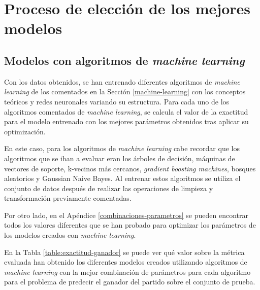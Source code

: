 \section{Proceso de elección de los mejores modelos}
\subsection{Modelos con algoritmos de \textit{machine learning}}
Con los datos obtenidos, se han entrenado diferentes algoritmos de \textit{machine learning} de los comentados en la Sección \ref{machine-learning} con los conceptos teóricos y redes neuronales variando su estructura. Para cada uno de los algoritmos comentados de \textit{machine learning}, se calcula el valor de la exactitud para el modelo entrenado con los mejores parámetros obtenidos tras aplicar su optimización.

En este caso, para los algoritmos de \textit{machine learning} cabe recordar que los algoritmos que se iban a evaluar eran los árboles de decisión, máquinas de vectores de soporte, k-vecinos más cercanos, \textit{gradient boosting machines}, bosques aleatorios y Gaussian Naive Bayes. Al entrenar estos algoritmos se utiliza el conjunto de datos después de realizar las operaciones de limpieza y transformación previamente comentadas.

Por otro lado, en el Apéndice \ref{combinaciones-parametros} se pueden encontrar todos los valores diferentes que se han probado para optimizar los parámetros de los modelos creados con \textit{machine learning}.








En la Tabla \ref{table:exactitud-ganador} se puede ver qué valor sobre la métrica evaluada han obtenido los diferentes modelos creados utilizando algoritmos de \textit{machine learning} con la mejor combinación de parámetros para cada algoritmo para el problema de predecir el ganador del partido sobre el conjunto de prueba.




